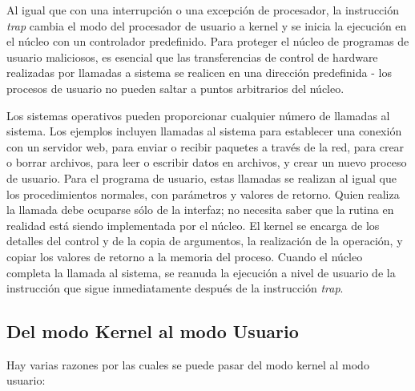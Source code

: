 \documentclass[10pt]{book}
\begin{document}
\begin{itemize}
Al igual que con una interrupción o una excepción de procesador, la instrucción \textit{trap} cambia el modo del procesador de usuario a kernel y se inicia la ejecución en el núcleo con un controlador predefinido. Para proteger el núcleo de programas de usuario maliciosos, es esencial que las transferencias de control de hardware realizadas por llamadas a sistema se realicen en una dirección predefinida - los procesos de usuario no pueden saltar a puntos arbitrarios del núcleo.

Los sistemas operativos pueden proporcionar cualquier número de llamadas al sistema. Los ejemplos incluyen llamadas al sistema para establecer una conexión con un servidor web, para enviar o recibir paquetes a través de la red, para crear o borrar archivos, para leer o escribir datos en archivos, y crear un nuevo proceso de usuario. Para el programa de usuario, estas llamadas se realizan al igual que los procedimientos normales, con parámetros y valores de retorno. Quien realiza la llamada debe ocuparse sólo de la interfaz; no necesita saber que la rutina en realidad está siendo implementada por el núcleo. El kernel se encarga de los detalles del control y de la copia de argumentos, la realización de la operación, y copiar los valores de retorno a la memoria del proceso. Cuando el núcleo completa la llamada al sistema, se reanuda la ejecución a nivel de usuario de la instrucción que sigue inmediatamente después de la instrucción \textit{trap}.
\end{itemize}

\subsection{Del modo Kernel al modo Usuario}
Hay varias razones por las cuales se puede pasar del modo kernel al modo usuario:
\end{document}
